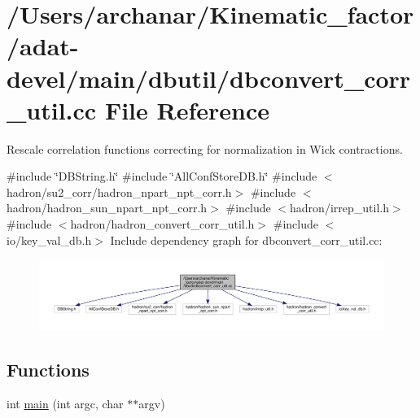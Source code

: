 \hypertarget{adat-devel_2main_2dbutil_2dbconvert__corr__util_8cc}{}\section{/\+Users/archanar/\+Kinematic\+\_\+factor/adat-\/devel/main/dbutil/dbconvert\+\_\+corr\+\_\+util.cc File Reference}
\label{adat-devel_2main_2dbutil_2dbconvert__corr__util_8cc}


Rescale correlation functions correcting for normalization in Wick contractions.  


{\ttfamily \#include \char`\"{}D\+B\+String.\+h\char`\"{}}\newline
{\ttfamily \#include \char`\"{}All\+Conf\+Store\+D\+B.\+h\char`\"{}}\newline
{\ttfamily \#include $<$hadron/su2\+\_\+corr/hadron\+\_\+npart\+\_\+npt\+\_\+corr.\+h$>$}\newline
{\ttfamily \#include $<$hadron/hadron\+\_\+sun\+\_\+npart\+\_\+npt\+\_\+corr.\+h$>$}\newline
{\ttfamily \#include $<$hadron/irrep\+\_\+util.\+h$>$}\newline
{\ttfamily \#include $<$hadron/hadron\+\_\+convert\+\_\+corr\+\_\+util.\+h$>$}\newline
{\ttfamily \#include $<$io/key\+\_\+val\+\_\+db.\+h$>$}\newline
Include dependency graph for dbconvert\+\_\+corr\+\_\+util.\+cc\+:
\nopagebreak
\begin{figure}[H]
\begin{center}
\leavevmode
\includegraphics[width=350pt]{d6/d8a/adat-devel_2main_2dbutil_2dbconvert__corr__util_8cc__incl}
\end{center}
\end{figure}
\subsection*{Functions}
\begin{DoxyCompactItemize}
\item 
int \mbox{\hyperlink{adat-devel_2main_2dbutil_2dbconvert__corr__util_8cc_a3c04138a5bfe5d72780bb7e82a18e627}{main}} (int argc, char $\ast$$\ast$argv)
\end{DoxyCompactItemize}



